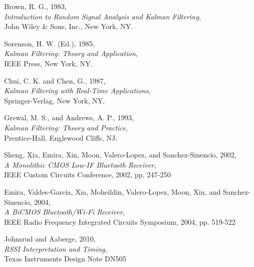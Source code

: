 \documentclass[12pt]{article}
\begin{document}
\begin{thebibliography}{9}

Brown, R. G., 1983, \\
\emph{Introduction to Random Signal Analysis and Kalman Filtering}, \\
John Wiley \& Sons, Inc., New York, NY.

Sorenson, H. W. (Ed.), 1985, \\
\emph{Kalman Filtering: Theory and Application}, \\
IEEE Press, New York, NY.

Chui, C. K. and Chen, G., 1987, \\
\emph{Kalman Filtering with Real-Time Applications}, \\
Springer-Verlag, New York, NY.

Grewal, M. S., and Andrews, A. P., 1993, \\
\emph{Kalman Filtering: Theory and Practice}, \\
Prentice-Hall, Englewood Cliffs, NJ.

Sheng, Xia, Emira, Xin, Moon, Valero-Lopez, and Sanchez-Sinencio, 2002, \\
\emph{A Monolithic CMOS Low-IF Bluetooth Receiver}, \\
IEEE Custom Circuits Conference, 2002, pp. 247-250

Emira, Valdes-Garcia, Xia, Moheildin, Valero-Lopez, Moon, Xin, and Sanchez-Sinencio, 2004, \\
\emph{A BiCMOS Bluetooth/Wi-Fi Receiver}, \\
IEEE Radio Frequency Integrated Circuits Symposium, 2004, pp. 519-522

Johnsrud and Aaberge, 2010, \\
\emph{RSSI Interpretation and Timing}, \\
Texas Instruments Design Note DN505

\end{thebibliography}
\end{document}
